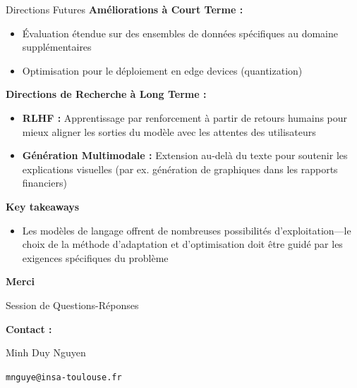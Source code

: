 \documentclass[11pt, aspectratio=169, xcolor=table]{beamer}
\begin{document}
\begin{frame}{Directions Futures}
    \footnotesize 
    \textbf{\color{MainNavy}Améliorations à Court Terme :}
    \begin{itemize}
        \item Évaluation étendue sur des ensembles de données spécifiques au domaine supplémentaires
        \item Optimisation pour le déploiement en edge devices (quantization)
    \end{itemize}
    
    \vspace{0.3cm}
    \textbf{\color{MainNavy}Directions de Recherche à Long Terme :}
    \begin{itemize}
        \item \textbf{RLHF :} Apprentissage par renforcement à partir de retours humains pour mieux aligner les sorties du modèle avec les attentes des utilisateurs
        \item \textbf{Génération Multimodale :} Extension au-delà du texte pour soutenir les explications visuelles (par ex. génération de graphiques dans les rapports financiers)
    \end{itemize}

    \vspace{0.3cm}
    \textbf{\color{MainNavy}Key takeaways}
    \begin{itemize}
        \item Les modèles de langage offrent de nombreuses possibilités d'exploitation—le choix de la méthode d'adaptation et d'optimisation doit être guidé par les exigences spécifiques du problème
    \end{itemize}
\end{frame}

\begin{frame}[plain]
    \begin{center}
        \vfill
        {\Huge\color{MainNavy}\textbf{Merci}}
        \vspace{0.5cm}
        
        {\Large Session de Questions-Réponses}
        \vspace{1cm}
        
        \textbf{Contact :}
        
        Minh Duy Nguyen
        
        \texttt{mnguye@insa-toulouse.fr}
        \vfill
    \end{center}
\end{frame}
\end{document}
